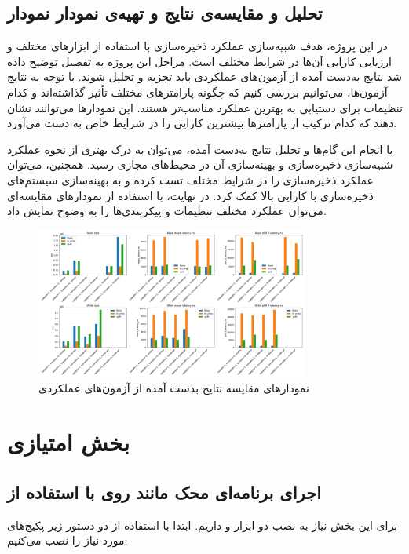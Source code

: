 \documentclass[12pt]{article}
\begin{document}
{\subsection*{تحلیل و مقایسه‌ی نتایج و تهیه‌ی نمودار نمودار}
در این پروژه، هدف شبیه‌سازی عملکرد ذخیره‌سازی  با استفاده از ابزارهای مختلف و ارزیابی کارایی آن‌ها در شرایط مختلف است. مراحل این پروژه به تفصیل توضیح داده شد
 نتایج به‌دست آمده از آزمون‌های عملکردی باید تجزیه و تحلیل شوند. با توجه به نتایج آزمون‌ها، می‌توانیم بررسی کنیم که چگونه پارامترهای مختلف تأثیر گذاشته‌اند و کدام تنظیمات برای دستیابی به بهترین عملکرد مناسب‌تر هستند.
  این نمودارها می‌توانند نشان دهند که کدام ترکیب از پارامترها بیشترین کارایی را در شرایط خاص به دست می‌آورد.

با انجام این گام‌ها و تحلیل نتایج به‌دست آمده، می‌توان به درک بهتری از نحوه عملکرد شبیه‌سازی ذخیره‌سازی  و بهینه‌سازی آن در محیط‌های مجازی رسید. همچنین، می‌توان عملکرد ذخیره‌سازی را در شرایط مختلف تست کرده و به بهینه‌سازی سیستم‌های ذخیره‌سازی با کارایی بالا کمک کرد.
در نهایت، با استفاده از نمودارهای مقایسه‌ای می‌توان عملکرد مختلف تنظیمات و پیکربندی‌ها را به وضوح نمایش داد.

\begin{figure}[h]
    \centering
    \includegraphics[width=0.8\textwidth]{plot.png}
    \caption{نمودارهای مقایسه نتایج بدست‌ آمده از آزمون‌های عملکردی}
\end{figure}

\newpage
\section*{بخش امتیازی}
\subsection*{اجرای برنامه‌ای محک مانند  روی  با استفاده از }
برای این بخش نیاز به نصب دو ابزار  و  داریم. ابتدا با استفاده از دو دستور زیر پکیج‌های مورد نیاز را نصب می‌کنیم:\\

}
\end{document}
